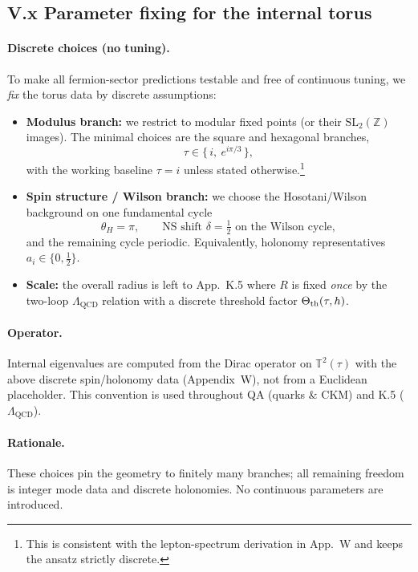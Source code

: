 \subsection*{V.x Parameter fixing for the internal torus}

\paragraph{Discrete choices (no tuning).}
To make all fermion-sector predictions testable and free of continuous tuning, we \emph{fix} the torus data by discrete assumptions:
\begin{itemize}
  \item \textbf{Modulus branch:} we restrict to modular fixed points (or their $\mathrm{SL}_2(\mathbb{Z})$ images). The minimal choices are the square and hexagonal branches,
  \[ \tau \in \Big\{\, i,\ e^{i\pi/3} \,\Big\}, \]
  with the working baseline $\tau=i$ unless stated otherwise.\footnote{This is consistent with the lepton-spectrum derivation in App.~W and keeps the ansatz strictly discrete.}
  \item \textbf{Spin structure / Wilson branch:} we choose the Hosotani/Wilson background on one fundamental cycle
  \[ \theta_{H}=\pi, \qquad \text{NS shift } \delta=\tfrac{1}{2} \text{ on the Wilson cycle}, \]
  and the remaining cycle periodic. Equivalently, holonomy representatives $a_i \in \{0,\tfrac12\}$.
  \item \textbf{Scale:} the overall radius is left to App.~K.5 where $R$ is fixed \emph{once} by the two-loop $\Lambda_{\mathrm{QCD}}$ relation with a discrete threshold factor $\Theta_{\rm th}(\tau,h)$.
\end{itemize}

\paragraph{Operator.} Internal eigenvalues are computed from the Dirac operator on $\mathbb{T}^2(\tau)$ with the above discrete spin/holonomy data (Appendix~W), not from a Euclidean placeholder. This convention is used throughout QA (quarks \& CKM) and K.5 ($\Lambda_{\mathrm{QCD}}$).

\paragraph{Rationale.} These choices pin the geometry to finitely many branches; all remaining freedom is integer mode data and discrete holonomies. No continuous parameters are introduced.
